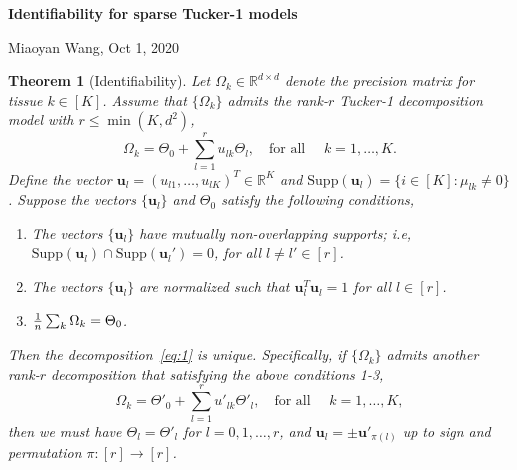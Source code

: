 \documentclass[11pt]{article}
\theoremstyle{plain}
\newtheorem{thm}{Theorem}[section]
\theoremstyle{definition}
\begin{document}
\begin{center}
{\Large \bf Identifiability for sparse Tucker-1 models}

Miaoyan Wang, Oct 1, 2020\\
\vspace{1cm}
\end{center}
\begin{thm}[Identifiability]
Let $\Omega_k\in\mathbb{R}^{d\times d}$ denote the precision matrix for tissue $k\in[K]$. Assume that $\{\Omega_k\}$ admits the rank-$r$ Tucker-1 decomposition model with $r\leq \min(K,d^2)$, 
\begin{equation}\label{eq:1}
\Omega_k=\Theta_0+\sum_{l=1}^r u_{lk}\Theta_l, \quad \text{for all } \quad k=1,\ldots,K.
\end{equation}
Define the vector $\mathbf{u}_l=(u_{l1},\ldots,u_{lK})^T\in\mathbb{R}^K$ and $\text{Supp}(\mathbf{u}_l)=\{i\in[K]\colon \mu_{lk}\neq 0\}$. Suppose the vectors $\{\mathbf{u}_l\}$ and $\Theta_0$ satisfy the following conditions,
\begin{enumerate}
\item The vectors $\{\mathbf{u}_l\}$ have mutually non-overlapping supports; i.e, $\text{Supp}(\mathbf{u}_l)\cap \text{Supp}(\mathbf{u}_l')=0$, for all $l\neq l'\in[r]$. 
\item The vectors $\{\mathbf{u}_l\}$ are normalized such that $\mathbf{u}^T_l\mathbf{u}_l=1$ for all $l\in[r]$.
\item ${1\over n}\sum_k\Omega_k = \Theta_0$.
\end{enumerate}
Then the decomposition~\eqref{eq:1} is unique. Specifically, if $\{\Omega_k\}$ admits another rank-$r$ decomposition that satisfying the above conditions 1-3,
\begin{equation}\label{eq:1}
\Omega_k=\Theta'_0+\sum_{l=1}^r u'_{lk}\Theta'_l, \quad \text{for all } \quad k=1,\ldots,K,
\end{equation}
then we must have $\Theta_l=\Theta'_l$ for $l=0,1,\ldots,r$, and $\mathbf{u}_l=\pm \mathbf{u'}_{\pi(l)}$ up to sign and permutation $\pi:[r]\to[r]$.
\end{thm}
\end{document}
